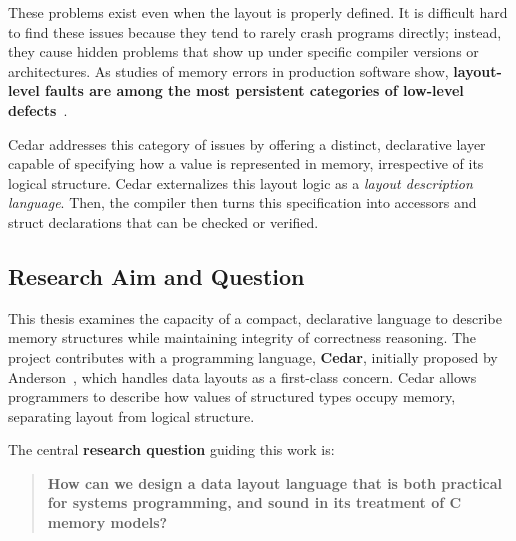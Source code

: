 These problems exist even when the layout is properly defined.
It is difficult hard to find these issues because they tend to rarely crash programs directly;
instead, they cause hidden problems that show up under specific
compiler versions or architectures. As studies of memory errors in production
software show, \textbf{layout-level faults are among the most persistent
categories of low-level defects}~\autocite{ubsan}.

Cedar addresses this category of issues by offering a distinct, declarative layer
capable of specifying how a value is represented in memory, irrespective of its logical
structure.  
Cedar externalizes this layout logic as a \textit{layout description language}.
Then, the compiler then turns this specification into accessors
and struct declarations that can be checked or verified.

\subsection{Research Aim and Question}
This thesis examines the capacity of a compact, declarative language to
describe memory structures while maintaining integrity of correctness reasoning.
The project contributes with a programming language, \textbf{Cedar}, initially proposed by
Anderson~\autocite{cedar_george}, which handles data layouts as a first-class
concern. Cedar allows programmers to describe how values of structured types
occupy memory, separating layout from logical structure.

The central \textbf{research question} guiding this work is:
\begin{quote}
    \textbf{How can we design a data layout language that is both practical
    for systems programming, and sound in its treatment of C memory models?}
\end{quote}

